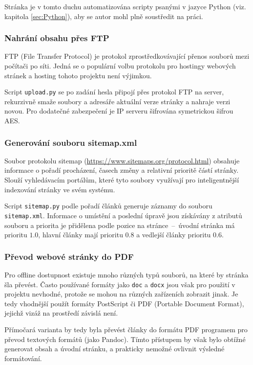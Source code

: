 \documentclass[a4paper, 12pt]{article}
\begin{document}
  Stránka je v tomto duchu automatizována scripty psanými v jazyce Python (viz. kapitola \ref{sec:Python}), aby se autor mohl plně soustředit na práci.


  \subsubsection{Nahrání obsahu přes FTP}
  FTP (File Transfer Protocol) je protokol zprostředkovávající přenos souborů mezi počítači po síti. Jedná se o populární volbu protokolu pro hostingy webových stránek a hosting tohoto projektu není výjimkou.

  Script \texttt{upload.py} se po zadání hesla připojí přes protokol FTP na server, rekurzivně smaže soubory a adresáře aktuální verze stránky a nahraje verzi novou. Pro dodatečné zabezpečení je IP serveru šifrována symetrickou šifrou AES.


  \subsubsection{Generování souboru sitemap.xml}
  Soubor protokolu sitemap (\url{https://www.sitemaps.org/protocol.html}) obsahuje informace o pořadí procházení, časech změny a relativní prioritě částí stránky. Slouží vyhledávacím portálům, které tyto soubory využívají pro inteligentnější indexování stránky ve svém systému.

  Script \texttt{sitemap.py} podle pořadí článků generuje záznamy do souboru \texttt{sitemap.xml}. Informace o umístění a poslední úpravě jsou získávány z atributů souboru a priorita je přidělena podle pozice na stránce~--~úvodní stránka má prioritu $1.0$, hlavní články mají prioritu $0.8$ a vedlejší články prioritu $0.6$.


  \subsubsection{Převod webové stránky do PDF} \label{sec:Převod webové stránky do PDF}
  Pro offline dostupnost existuje mnoho různých typů souborů, na které by stránka šla převést. Často používané formáty jako \texttt{doc} a \texttt{docx} jsou však pro použití v projektu nevhodné, protože se mohou na různých zařízeních zobrazit jinak. Je tedy vhodnější použít formáty PostScript či PDF (Portable Document Format), jejichž vizáž na prostředí závislá není\cite{history-of-pdf}.

  Přímočará varianta by tedy byla převést články do formátu PDF programem pro převod textových formátů (jako Pandoc). Tímto přístupem by však bylo obtížné generovat obsah a úvodní stránku, a prakticky nemožné ovlivnit výsledné formátování.
\end{document}
